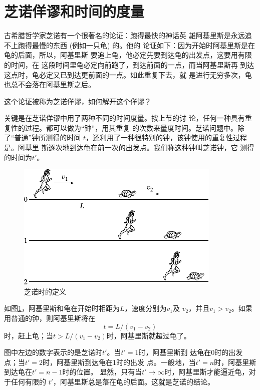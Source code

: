 \section{芝诺佯谬和时间的度量}\label{sec:01.02}

古希腊哲学家芝诺有一个很著名的论证：跑得最快的神话英
雄阿基里斯是永远追不上跑得最慢的东西 (例如一只龟) 的。他的
论证如下：因为开始时阿基里斯是在龟的后面，所以，阿基里斯
要追上龟，他必定先要到达龟的出发点，这要用有限的时间，在
这段时间里龟必定向前跑了，到达前面的一点，而当阿基里斯再
到达这点时，龟必定又已到达更前面的一点。如此重复下去，就
是进行无穷多次，龟也总不会落在阿基里斯之后。

这个论证被称为芝诺佯谬，如何解开这个佯谬？

关键是在芝诺佯谬中用了两种不同的时间度量。按上节的讨
论，任何一种具有重复性的过程。都可以做为“钟”，用其重复
的次数来量度时间。芝诺问题中。除了“普通”钟所测得的时间
$t$，还利用了一种很特别的钟，该钟使用的重复性过程是。阿基里
斯逐次地到达龟在前一次的出发点。我们称这种钟叫芝诺钟，它
测得的时间为$t'$。

\begin{figure}[!h]
  \centering
  \includegraphics{figure/fig01.02}
  \caption{芝诺时的定义}\label{fig:01.02}
\end{figure}

如图\ref{fig:01.02}，阿基里斯和龟在开始时相距为$L$，速度分别为$v_1$及
$v_2$，并且$v_1>v_2$。如果用普通的钟，则阿基里斯将在
\begin{equation}
  t=L/\left(v_1-v_2\right)
  \label{eqn:01.02.01}
\end{equation}
时，赶上龟；当$t>L/\left(v_1-v_2\right)$时，阿基里斯就超过龟了。

图中左边的数字表示的是芝诺时$t'$。当$t'=1$时，阿基里斯到
达龟在0时的出发点；当$t'=2$时，阿基里斯到达龟在1时的出发
点。一般地，当$t'=n$时，阿基里斯到达龟在$t'=n-1$时的位置。
显然，只有当$t'\to\infty$时，阿基里斯才能逼近龟，对于任何有限的
$t'$，阿基里斯总是落在龟的后面。这就是芝诺的结论。

